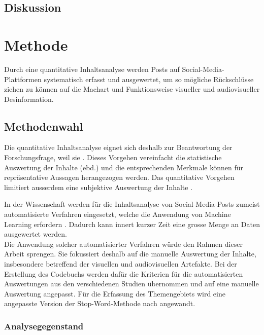 \documentclass[12pt,a4paper]{article}        %
\begin{document}
\subsection{Diskussion}

\pagebreak
\section{Methode}

Durch eine quantitative Inhaltsanalyse werden Posts auf Social-Media-Plattformen systematisch erfasst und ausgewertet, um so mögliche Rückschlüsse ziehen zu können auf die Machart und Funktionsweise visueller und audiovisueller Desinformation.
\subsection{Methodenwahl}
Die quantitative Inhaltsanalyse eignet sich deshalb zur Beantwortung der Forschungsfrage, weil sie  \parencite[11]{oehmer-pedrazzi_standardisierte_2023}. Dieses Vorgehen vereinfacht die statistische Auswertung der Inhalte (ebd.) und die entsprechenden Merkmale können für repräsentative Aussagen herangezogen werden. Das quantitative Vorgehen limitiert ausserdem eine subjektive Auswertung der Inhalte \parencite[140]{lai_content_2015}.

In der Wissenschaft werden für die Inhaltsanalyse von Social-Media-Posts zumeist automatisierte Verfahren eingesetzt, welche die Anwendung von Machine Learning erfordern \parencites[vgl.\ bspw.]{andreotta_analyzing_2019}{lai_content_2015}
{schwartz_data-driven_2015}{wilson_content_2022}{wang_video_2015}. Dadurch kann innert kurzer Zeit eine grosse Menge an Daten ausgewertet werden.\\
Die Anwendung solcher automatisierter Verfahren würde den Rahmen dieser Arbeit sprengen. Sie fokussiert deshalb auf die manuelle Auswertung der Inhalte, insbesondere betreffend der visuellen und audiovisuellen Artefakte. Bei der Erstellung des Codebuchs werden dafür die Kriterien für die automatisierten Auswertungen aus den verschiedenen Studien übernommen und auf eine manuelle Auswertung angepasst. Für die Erfassung des Themengebiets wird eine angepasste Version der Stop-Word-Methode nach \textcite{schwartz_data-driven_2015} angewandt.
\subsubsection{Analysegegenstand}
\end{document}
